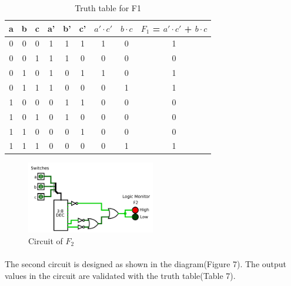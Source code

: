 \documentclass[pdftex,12pt,a4paper]{article}
\begin{document}
\begin{flushleft}
\begin{table}[h]
\centering
\begin{tabular}{|c|c|c|c|c|c|c|c|c|}
\hline
a & b & c & a' & b' & c' & $a' \cdot c'$ & $b \cdot c$ & $F_{1}$ = $a' \cdot c'$ + $b \cdot c$     \\ \hline
0 & 0 & 0 & 1  & 1  & 1  & 1             & 0      & 1             \\ \hline
0 & 0 & 1 & 1  & 1  & 0  & 0             & 0      & 0               \\ \hline
0 & 1 & 0 & 1  & 0  & 1  & 1             & 0      & 1              \\ \hline
0 & 1 & 1 & 1  & 0  & 0  & 0             & 1      & 1               \\ \hline
1 & 0 & 0 & 0  & 1  & 1  & 0             & 0      & 0               \\ \hline
1 & 0 & 1 & 0  & 1  & 0  & 0             & 0      & 0           \\ \hline
1 & 1 & 0 & 0  & 0  & 1  & 0             & 0      & 0          \\ \hline
1 & 1 & 1 & 0  & 0  & 0  & 0             & 1      & 1               \\ \hline
\end{tabular}
\caption{Truth table for F1}
\label{fig3}
\end{table}






\begin{figure}[!h]
	\centering
	\includegraphics[width=0.5\textwidth]{part4_f2.png}	
	\caption{Circuit of $F_2$}
	\label{fig1}
\end{figure}

\paragraph{}
The second circuit is designed as shown in the diagram(Figure 7). The output values in the circuit are validated with the truth table(Table 7).


\end{flushleft}
\end{document}
